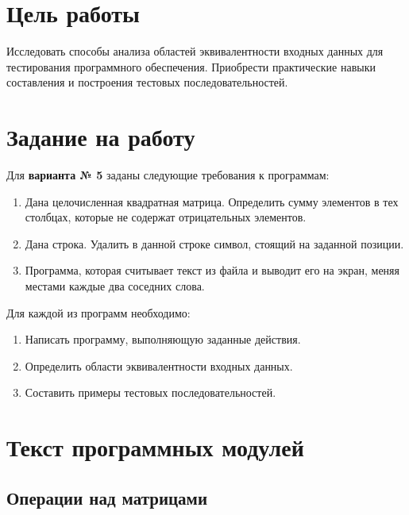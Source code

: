 \documentclass[a4paper,14pt]{extarticle}
\begin{document}

    \section{Цель работы}

    Исследовать способы анализа областей эквивалентности входных данных 
    для тестирования программного обеспечения. Приобрести практические
    навыки составления и построения тестовых последовательностей.

    \section{Задание на работу}

    Для \textbf{варианта № 5} заданы следующие требования к программам: 

    \begin{enumerate}
        \item Дана целочисленная квадратная матрица. Определить сумму элементов
              в тех столбцах, которые не содержат отрицательных элементов.
        \item Дана строка. Удалить в данной строке символ, стоящий на заданной
              позиции.
        \item Программа, которая считывает текст из файла и выводит его на
              экран, меняя местами каждые два соседних слова.
    \end{enumerate}

    Для каждой из программ необходимо:

    \begin{enumerate}
        \item Написать программу, выполняющую заданные действия.
        \item Определить области эквивалентности входных данных.
        \item Составить примеры тестовых последовательностей.
    \end{enumerate}

    \section{Текст программных модулей}
    \subsection{Операции над матрицами}
\end{document}
